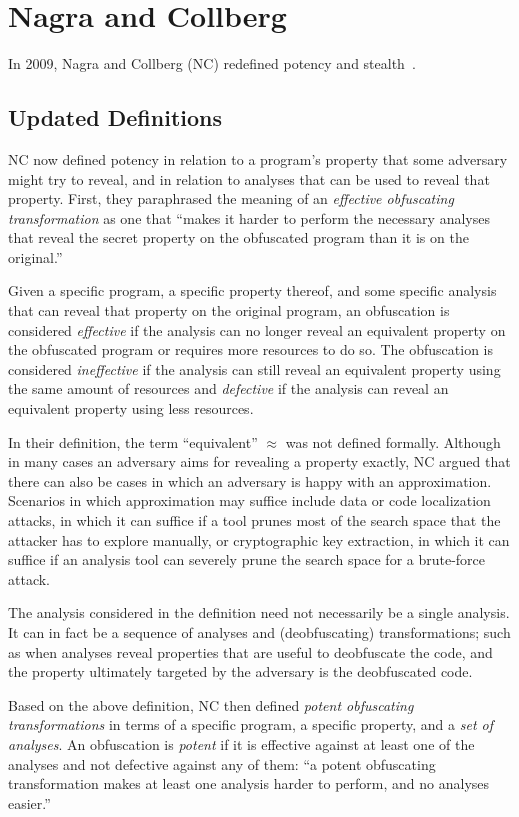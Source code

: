\section{Nagra and Collberg}
In 2009, Nagra and Collberg (NC) redefined potency and stealth~\cite{collbergbook}.

\subsection{Updated Definitions}
\label{sec:collberg_nagra_def}
NC now defined potency in relation to a program's property that some adversary might try to reveal, and in relation to analyses that can be used to reveal that property. First, they paraphrased the meaning of an \emph{effective obfuscating transformation} as one that ``makes it harder to perform the necessary analyses that reveal the secret property on the obfuscated program than it is on the original.''

Given a specific program, a specific property thereof, and some specific analysis that can reveal that property on the original program, an obfuscation is considered \emph{effective} if the analysis can no longer reveal an equivalent property on the obfuscated program or requires more resources to do so. The obfuscation is considered \emph{ineffective} if the analysis can still reveal an equivalent property using the same amount of resources and \emph{defective} if the analysis can reveal an equivalent property using less resources. 

In their definition, the term ``equivalent'' $\approx$ was not defined formally. Although in many cases an adversary aims for revealing a property exactly, NC argued that there can also be cases in which an adversary is happy with an approximation. Scenarios in which approximation may suffice include data or code localization attacks, in which it can suffice if a tool prunes most of the search space that the attacker has to explore manually, or cryptographic key extraction, in which it can suffice if an analysis tool can severely prune the search space for a brute-force attack. 

The analysis considered in the definition need not necessarily be a single analysis. It can in fact be a sequence of analyses and (deobfuscating) transformations; such as when analyses reveal properties that are useful to deobfuscate the code, and the property ultimately targeted by the adversary is the deobfuscated code. 

Based on the above definition, NC then defined \emph{potent obfuscating transformations} in terms of a specific program, a specific property, and a \emph{set of analyses}. An obfuscation is \emph{potent} if it is effective against at least one of the analyses and not defective against any of them: ``a potent obfuscating transformation makes at least one analysis harder to perform, and no analyses easier.''

